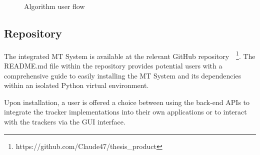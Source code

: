 \begin{figure}
    \caption{Algorithm user flow\label{fig:gui_CHD}}
\end{figure}

\subsection{Repository}
The integrated MT System is available at the relevant GitHub
repository~\cite{repository}~\footnote{https://github.com/Claude47/thesis\_product}.
The README.md file within the repository provides potential users with a comprehensive guide to
easily installing the MT System and its dependencies within an isolated Python virtual environment.

Upon installation, a user is offered a choice between using the back-end APIs to
integrate the tracker implementations into their own applications or to interact
with the trackers via the GUI interface. 
